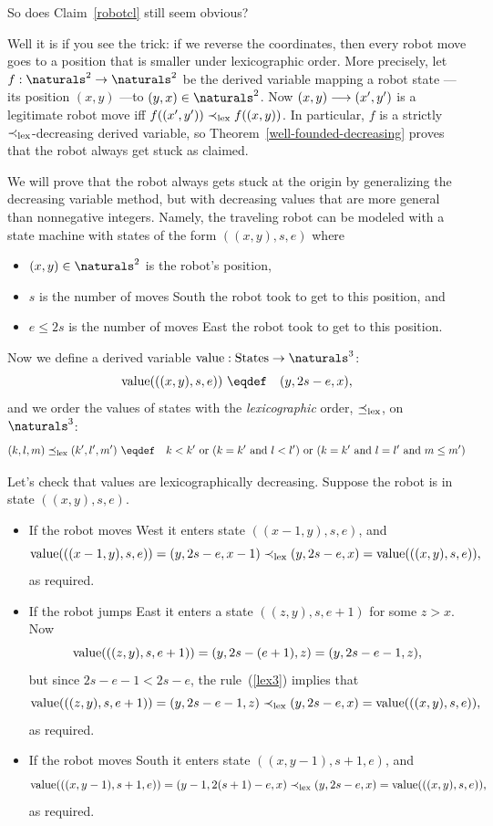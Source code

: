 So does Claim~\ref{robotcl} still seem obvious?

Well it is if you see the trick: if we reverse the coordinates, then every
robot move goes to a position that is smaller under lexicographic order.
More precisely, let $f:\naturals^2 \to \naturals^2$ be the derived variable
mapping a robot state ---its position $(x,y)$ ---to $(y,x) \in
\naturals^2$.  Now $(x,y)\mathrel{\longrightarrow} (x',y')$ is a legitimate robot move iff
$f((x',y')) \lex< f((x,y))$.  In particular, $f$ is a strictly
$\lex<$-decreasing derived variable, so
Theorem~\ref{well-founded-decreasing} proves that the robot always get
stuck as claimed.
\fi



\iffalse

We will prove that the robot always gets stuck at the origin by
generalizing the decreasing variable method, but with decreasing values
that are more general than nonnegative integers.  Namely, the traveling robot
can be modeled with a state machine with states of the form $((x,y),s,e)$
where
\begin{itemize}
\item $(x,y) \in \naturals^2$ is the robot's position,
\item $s$ is the number of moves South the robot took to get to this
position, and
\item $e \le 2s$ is the number of moves East the robot took to get to this
position. 
\end{itemize}

Now we define a derived variable $\vl:\text{States}\to \naturals^3$:
\[
\vl(((x,y),s,e)) \ \eqdef\quad (y,2s-e,x),
\]
and we order the values of states with the \emph{lexicographic} order,
$\mathrel{\preceq_{\text{lex}}}$, on $\naturals^3$:
\begin{equation}\label{lex3}
(k,l,m) \lexle (k',l',m') \ \eqdef\quad k < k' \text{ or } (k=k' \text{
and } l < l') \text{ or } (k=k' \text{ and } l = l' \text{ and } m \le m')
\end{equation}

Let's check that values are lexicographically decreasing.  Suppose the
robot is in state $((x,y),s,e)$.
\begin{itemize}
\item If the robot moves West it enters state $((x-1,y),s,e)$, and
\[
\vl(((x-1,y),s,e)) = (y,2s-e,x-1) \lex< (y,2s-e,x) = \vl(((x,y),s,e)),
\]
as required.


\item If the robot jumps East it enters a state $((z,y),s,e+1)$ for some
$z>x$.  Now
\[
\text{value}(((z,y),s,e+1)) = (y,2s-(e+1),z) = (y,2s-e-1,z),
\]
but since $2s-e-1 < 2s-e$, the rule~(\ref{lex3}) implies that
\[
\vl(((z,y),s,e+1)) = (y,2s-e-1,z)  \lex< (y,2s-e,x) = \vl(((x,y),s,e)),
\]
as required.

\item If the robot moves South it enters state $((x,y-1),s+1,e)$, and
\[
\vl(((x,y-1),s+1,e)) = (y-1,2(s+1)-e,x) \lex< (y,2s-e,x) = \vl(((x,y),s,e)),
\]
as required.

\end{itemize}

